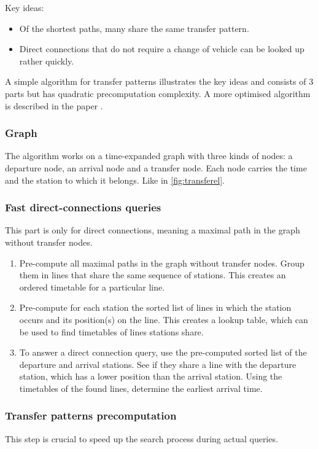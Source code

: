 Key ideas:
\begin{itemize}
    \item Of the shortest paths, many share the same transfer pattern.
    \item Direct connections that do not require a change of vehicle can be looked up rather quickly. 
\end{itemize}
A simple algorithm for transfer patterns illustrates the key ideas and consists of 3 parts but has quadratic precomputation complexity. A more optimised algorithm is described in the paper \cite{bast_fast_2010}.
\subsubsection{Graph}
The algorithm works on a time-expanded graph with three kinds of nodes: a departure node, an arrival node and a transfer node. Each node carries the time and the station to which it belongs. Like in \autoref{fig:transferel}.

\subsubsection{Fast direct-connections queries}
This part is only for direct connections, meaning a maximal path in the graph without transfer nodes.

\begin{enumerate}
    \item Pre-compute all maximal paths in the graph without transfer nodes. Group them in lines that share the same sequence of stations. This creates an ordered timetable for a particular line.
    \item Pre-compute for each station the sorted list of lines in which the station occurs and its position(s) on the line. This creates a lookup table, which can be used to find timetables of lines stations share.
    \item To answer a direct connection query, use the pre-computed sorted list of the departure and arrival stations. See if they share a line with the departure station, which has a lower position than the arrival station. Using the timetables of the found lines, determine the earliest arrival time.
\end{enumerate}
\subsubsection{Transfer patterns precomputation}
This step is crucial to speed up the search process during actual queries. 

